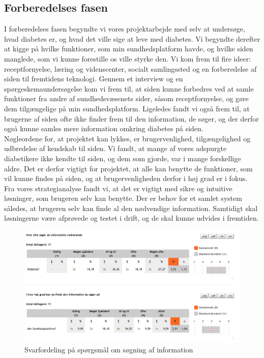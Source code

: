 \subsection{Forberedelses fasen}
I forberedelses fasen begyndte vi vores projektarbejde med selv at undersøge, hvad diabetes er, og hvad det ville sige at leve med diabetes. Vi begyndte derefter at kigge på hvilke funktioner, som min sundhedsplatform havde, og hvilke siden manglede, som vi kunne forestille os ville styrke den. Vi kom frem til fire ideer: receptfornyelse, læring og videnscenter, socialt samlingssted og en forberedelse af siden til fremtidens teknologi. Gennem et interview og en spørgeskemaundersøgelse kom vi frem til, at siden kunne forbedres ved at samle funktioner fra andre af sundhedsvæsenets sider, såsom receptfornyelse, og gøre dem tilgængelige på min sundhedsplatform. Ligeledes fandt vi også frem til, at brugerne af siden ofte ikke finder frem til den information, de søger, og der derfor også kunne samles mere information omkring diabetes på siden.\\
Nøgleordene for, at projektet kan lykkes, er brugervenlighed, tilgængelighed og udbredelse af kendskab til siden. Vi fandt, at mange af vores adspurgte diabetikere ikke kendte til siden, og dem som gjorde, var i mange forskellige aldre. Det er derfor vigtigt for projektet, at alle kan benytte de funktioner, som vil kunne findes på siden, og at brugervenligheden derfor i høj grad er i fokus.\\
Fra vores strategianalyse fandt vi, at det er vigtigt med sikre og intuitive løsninger, som brugeren selv kan benytte. Der er behov for et samlet system således, at brugeren selv kan finde al den nødvendige information. Samtidigt skal løsningerne være afprøvede og testet i drift, og de skal kunne udvides i fremtiden.
\begin{figure}[H]
	\centering
	\includegraphics[width=\textwidth]{Materials/SeekingInformation}
	\caption{Svarfordeling på spørgsmål om søgning af information}
\end{figure}
